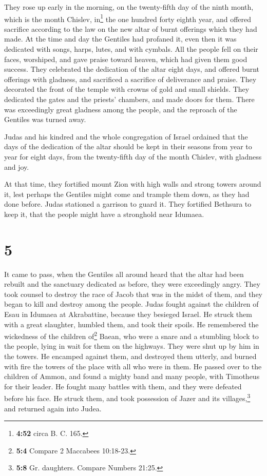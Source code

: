 They rose up early in the morning, on the twenty-fifth
day of the ninth month, which is the month Chislev, in\footnote{\textbf{4:52}
  circa B. C. 165.} the one hundred forty eighth year, 
and offered sacrifice according to the law on the new altar of burnt
offerings which they had made.  At the time and day the
Gentiles had profaned it, even then it was dedicated with songs, harps,
lutes, and with cymbals.  All the people fell on their
faces, worshiped, and gave praise toward heaven, which had given them
good success.  They celebrated the dedication of the
altar eight days, and offered burnt offerings with gladness, and
sacrificed a sacrifice of deliverance and praise.  They
decorated the front of the temple with crowns of gold and small shields.
They dedicated the gates and the priests' chambers, and made doors for
them.  There was exceedingly great gladness among the
people, and the reproach of the Gentiles was turned away.

 Judas and his kindred and the whole congregation of
Israel ordained that the days of the dedication of the altar should be
kept in their seasons from year to year for eight days, from the
twenty-fifth day of the month Chislev, with gladness and joy.

 At that time, they fortified mount Zion with high walls
and strong towers around it, lest perhaps the Gentiles might come and
trample them down, as they had done before.  Judas
stationed a garrison to guard it. They fortified Bethsura to keep it,
that the people might have a stronghold near Idumaea.

\hypertarget{section-4}{%
\section{5}\label{section-4}}

 It came to pass, when the Gentiles all around heard that
the altar had been rebuilt and the sanctuary dedicated as before, they
were exceedingly angry.  They took counsel to destroy the
race of Jacob that was in the midst of them, and they began to kill and
destroy among the people.  Judas fought against the
children of Esau in Idumaea at Akrabattine, because they besieged
Israel. He struck them with a great slaughter, humbled them, and took
their spoils.  He remembered the wickedness of the
children of\footnote{\textbf{5:4} Compare 2 Maccabees 10:18-23.} Baean,
who were a snare and a stumbling block to the people, lying in wait for
them on the highways.  They were shut up by him in the
towers. He encamped against them, and destroyed them utterly, and burned
with fire the towers of the place with all who were in them.
 He passed over to the children of Ammon, and found a
mighty band and many people, with Timotheus for their leader.
 He fought many battles with them, and they were defeated
before his face. He struck them,  and took possession of
Jazer and its villages,\footnote{\textbf{5:8} Gr. daughters. Compare
  Numbers 21:25.} and returned again into Judea.

